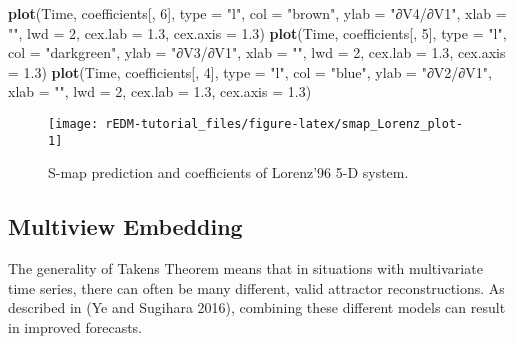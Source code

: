 \documentclass[]{article}
\newenvironment{Shaded}{\begin{snugshade}}{\end{snugshade}}
\newcommand{\DataTypeTok}[1]{\textcolor[rgb]{0.13,0.29,0.53}{#1}}
\newcommand{\DecValTok}[1]{\textcolor[rgb]{0.00,0.00,0.81}{#1}}
\newcommand{\FloatTok}[1]{\textcolor[rgb]{0.00,0.00,0.81}{#1}}
\newcommand{\KeywordTok}[1]{\textcolor[rgb]{0.13,0.29,0.53}{\textbf{#1}}}
\newcommand{\NormalTok}[1]{#1}
\newcommand{\StringTok}[1]{\textcolor[rgb]{0.31,0.60,0.02}{#1}}
\begin{document}
\begin{Shaded}
\begin{Highlighting}[]
\KeywordTok{plot}\NormalTok{(Time, coefficients[, }\DecValTok{6}\NormalTok{], }\DataTypeTok{type =} \StringTok{"l"}\NormalTok{, }\DataTypeTok{col =} \StringTok{"brown"}\NormalTok{, }\DataTypeTok{ylab =} \StringTok{"∂V4/∂V1"}\NormalTok{, }\DataTypeTok{xlab =} \StringTok{""}\NormalTok{, }
    \DataTypeTok{lwd =} \DecValTok{2}\NormalTok{, }\DataTypeTok{cex.lab =} \FloatTok{1.3}\NormalTok{, }\DataTypeTok{cex.axis =} \FloatTok{1.3}\NormalTok{)}
\KeywordTok{plot}\NormalTok{(Time, coefficients[, }\DecValTok{5}\NormalTok{], }\DataTypeTok{type =} \StringTok{"l"}\NormalTok{, }\DataTypeTok{col =} \StringTok{"darkgreen"}\NormalTok{, }\DataTypeTok{ylab =} \StringTok{"∂V3/∂V1"}\NormalTok{, }
    \DataTypeTok{xlab =} \StringTok{""}\NormalTok{, }\DataTypeTok{lwd =} \DecValTok{2}\NormalTok{, }\DataTypeTok{cex.lab =} \FloatTok{1.3}\NormalTok{, }\DataTypeTok{cex.axis =} \FloatTok{1.3}\NormalTok{)}
\KeywordTok{plot}\NormalTok{(Time, coefficients[, }\DecValTok{4}\NormalTok{], }\DataTypeTok{type =} \StringTok{"l"}\NormalTok{, }\DataTypeTok{col =} \StringTok{"blue"}\NormalTok{, }\DataTypeTok{ylab =} \StringTok{"∂V2/∂V1"}\NormalTok{, }\DataTypeTok{xlab =} \StringTok{""}\NormalTok{, }
    \DataTypeTok{lwd =} \DecValTok{2}\NormalTok{, }\DataTypeTok{cex.lab =} \FloatTok{1.3}\NormalTok{, }\DataTypeTok{cex.axis =} \FloatTok{1.3}\NormalTok{)}
\end{Highlighting}
\end{Shaded}

\begin{figure}[h]

{\centering \texttt{[image: rEDM-tutorial\_files/figure-latex/smap\_Lorenz\_plot-1]} 

}

\caption{S-map prediction and coefficients of Lorenz'96 5-D system.}\label{fig:smap_Lorenz_plot}
\end{figure}

\newpage

\hypertarget{multiview-embedding}{%
\subsection{Multiview Embedding}\label{multiview-embedding}}

The generality of Takens Theorem means that in situations with
multivariate time series, there can often be many different, valid
attractor reconstructions. As described in (Ye and Sugihara 2016),
combining these different models can result in improved forecasts.
\end{document}
